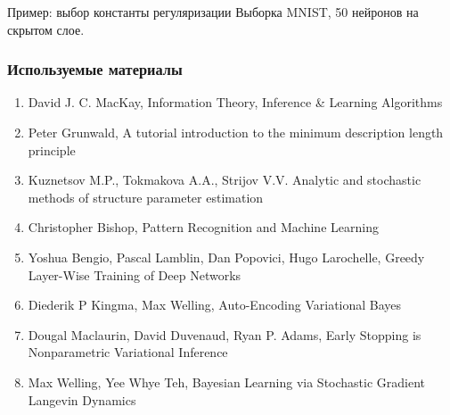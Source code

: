 \documentclass[10pt,pdf,utf8,russian,aspectratio=169]{beamer}
\begin{document}
\begin{frame}{Пример: выбор константы регуляризации}
Выборка MNIST, 50 нейронов на скрытом слое.

\begin{figure}
  \centering
\label{fig:1}\qquad
\end{figure}

\end{frame}

\begin{frame}
\frametitle{Используемые материалы}
\begin{enumerate}
\item David J. C. MacKay, Information Theory, Inference \& Learning Algorithms
\item Peter Grunwald, A tutorial introduction to the minimum description length principle
\item Kuznetsov M.P., Tokmakova A.A., Strijov V.V. Analytic and stochastic methods of structure parameter estimation
\item Christopher Bishop, Pattern Recognition and Machine Learning
\item Yoshua Bengio, Pascal Lamblin, Dan Popovici, Hugo Larochelle, Greedy Layer-Wise Training of Deep Networks
\item Diederik P Kingma, Max Welling, Auto-Encoding Variational Bayes
\item Dougal Maclaurin, David Duvenaud, Ryan P. Adams, Early Stopping is Nonparametric Variational Inference
\item Max Welling, Yee Whye Teh, Bayesian Learning via Stochastic Gradient Langevin Dynamics
\end{enumerate}
\end{frame}
\end{document}
